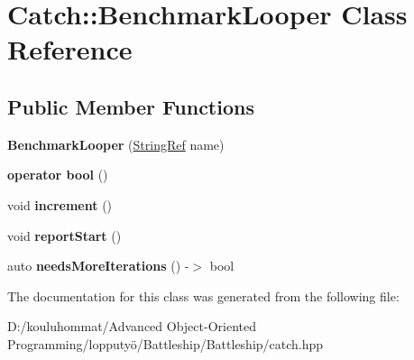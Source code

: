\hypertarget{class_catch_1_1_benchmark_looper}{}\section{Catch\+:\+:Benchmark\+Looper Class Reference}
\label{class_catch_1_1_benchmark_looper}
\subsection*{Public Member Functions}
\begin{DoxyCompactItemize}
\item 
\mbox{\label{class_catch_1_1_benchmark_looper_ab9ba6397306a70082f39e63a8a71bde6}} 
{\bfseries Benchmark\+Looper} (\mbox{\hyperlink{class_catch_1_1_string_ref}{String\+Ref}} name)
\item 
\mbox{\label{class_catch_1_1_benchmark_looper_a54da41bada9da038dc05faf41d746765}} 
{\bfseries operator bool} ()
\item 
\mbox{\label{class_catch_1_1_benchmark_looper_a210552aff5b19408637444d4bb35d59c}} 
void {\bfseries increment} ()
\item 
\mbox{\label{class_catch_1_1_benchmark_looper_a0697d1b266112b110edf2025b82c4e77}} 
void {\bfseries report\+Start} ()
\item 
\mbox{\label{class_catch_1_1_benchmark_looper_a97bd944521f519b1593a5d1d2f9998fa}} 
auto {\bfseries needs\+More\+Iterations} () -\/$>$ bool
\end{DoxyCompactItemize}


The documentation for this class was generated from the following file\+:\begin{DoxyCompactItemize}
\item 
D\+:/kouluhommat/\+Advanced Object-\/\+Oriented Programming/lopputyö/\+Battleship/\+Battleship/catch.\+hpp\end{DoxyCompactItemize}
